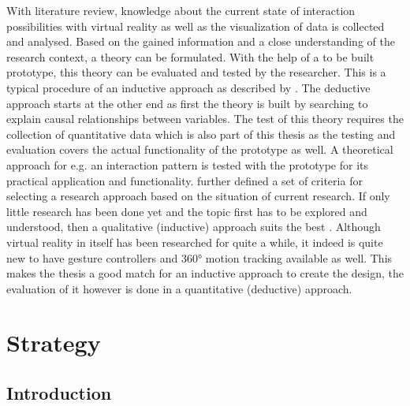 With literature review, knowledge about the current state of interaction possibilities with virtual reality as well as the visualization of data is collected and analysed. Based on the gained information and a close understanding of the research context, a theory can be formulated. With the help of a to be built prototype, this theory can be evaluated and tested by the researcher. This is a typical procedure of an inductive approach as described by \cite{Saunders2009}. \newline
The deductive approach starts at the other end as first the theory is built by searching to explain causal relationships between variables. The test of this theory requires the collection of quantitative data which is also part of this thesis as the testing and evaluation covers the actual functionality of the prototype as well. A theoretical approach for e.g. an interaction pattern is tested with the prototype for its practical application and functionality. \newline
\cite{Creswell2014} further defined a set of criteria for selecting a research approach based on the situation of current research. If only little research has been done yet and the topic first has to be explored and understood, then a qualitative (inductive) approach suits the best \citep{Creswell2014}. Although virtual reality in itself has been researched for quite a while, it indeed is quite new to have gesture controllers and 360° motion tracking available as well. This makes the thesis a good match for an inductive approach to create the design, the evaluation of it however is done in a quantitative (deductive) approach.


\section{Strategy}


\subsection{Introduction}

